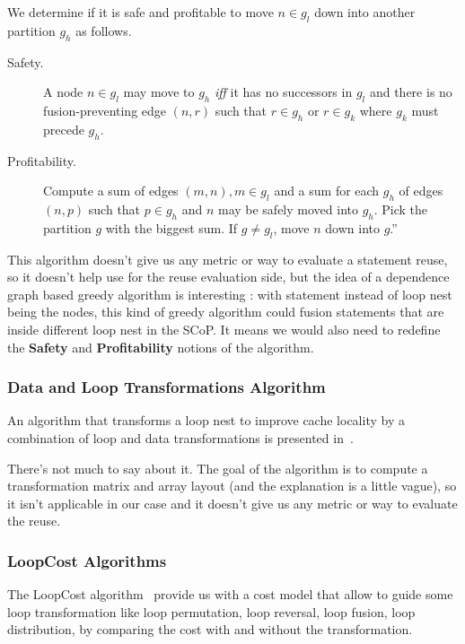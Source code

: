 \documentclass[paper=a4, fontsize=11pt]{scrartcl}
\numberwithin{equation}{section}        %
\numberwithin{figure}{section}          %
\numberwithin{table}{section}               %
\begin{document}
                We determine if it is safe and profitable to move $n \in g_l$ down
                into another partition $g_h$ as follows.
                \begin{description}
                    \item [Safety.] A node $n \in g_l$ may move to $g_h$ \textit{iff} it
                        has no successors in $g_l$ and there is no fusion-preventing
                        edge $(n,r)$ such that $r \in g_h$ or $r \in g_k$ where
                        $g_k$ must precede $g_h$.
                    \item [Profitability.] Compute a sum of edges $(m,n), m \in g_l$
                        and a sum for each $g_h$ of edges $(n,p)$ such that $p \in g_h$
                        and $n$ may be safely moved into $g_h$. Pick the partition
                        $g$ with the biggest sum. If $g \neq g_l$, move $n$ down into $g$.''
                \end{description}
            \bigskip
            
            This algorithm doesn't give us any metric or way to evaluate a statement
            reuse, so it doesn't help use for the reuse evaluation side, but the idea
            of a dependence graph based greedy algorithm is interesting : with statement
            instead of loop nest being the nodes, this kind of greedy algorithm 
            could fusion statements that are inside different loop nest in the SCoP.
            It means we would also need to redefine the \textbf{Safety} and \textbf{Profitability}
            notions of the algorithm.

        \subsubsection{Data and Loop Transformations Algorithm}
            An algorithm that transforms a loop nest to improve cache locality
            by a combination of loop and data transformations is presented in~\cite{Kandemir99improvingcache}.

            There's not much to say about it. The goal of the algorithm is to
            compute a transformation matrix and array layout (and the explanation is a little
            vague), so it isn't applicable in our case and it doesn't give us any metric or way to evaluate the reuse.
        
        \subsubsection{LoopCost Algorithms}
            The LoopCost algorithm~\cite{McKinley:1996:IDL:233561.233564} provide
            us with a cost model that allow to guide some loop transformation like
            loop permutation, loop reversal, loop fusion, loop distribution,
            by comparing the cost with and without the transformation.
            
\end{document}
